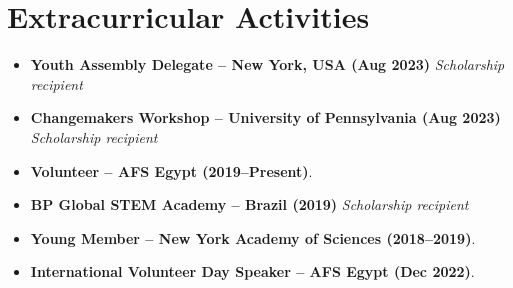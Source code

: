 \documentclass[a4paper,10pt]{article}
\begin{document}
\section{Extracurricular Activities}
  \begin{itemize}[leftmargin=*,itemsep=2pt,topsep=0pt]
    \item \textbf{Youth Assembly Delegate -- New York, USA (Aug 2023)} \hfill \textit{Scholarship recipient}
    \item \textbf{Changemakers Workshop -- University of Pennsylvania (Aug 2023)} \hfill \textit{Scholarship recipient}
    \item \textbf{Volunteer -- AFS Egypt (2019--Present)}.
    \item \textbf{BP Global STEM Academy -- Brazil (2019)} \hfill \textit{Scholarship recipient}
    \item \textbf{Young Member -- New York Academy of Sciences (2018--2019)}.
    \item \textbf{International Volunteer Day Speaker -- AFS Egypt (Dec 2022)}.
  \end{itemize}
\end{document}
